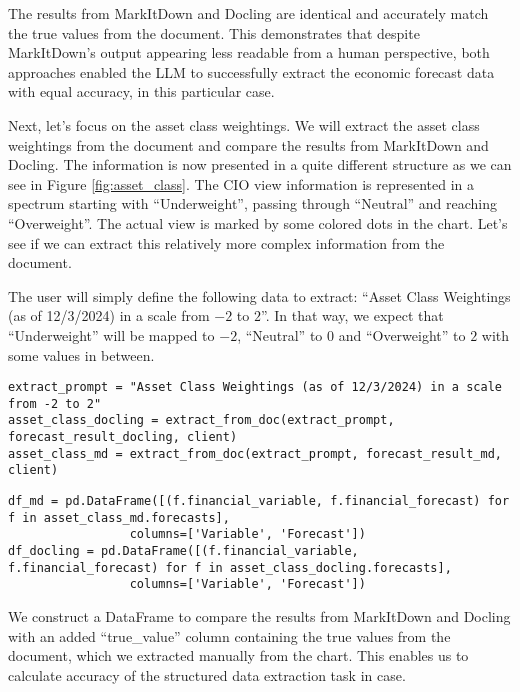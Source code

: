The results from MarkItDown and Docling are identical and accurately match the true values from the document. This demonstrates that despite MarkItDown's output appearing less readable from a human perspective, both approaches enabled the LLM to successfully extract the economic forecast data with equal accuracy, in this particular case.

Next, let's focus on the asset class weightings. We will extract the asset class weightings from the document and compare the results from MarkItDown and Docling. The information is now presented in a quite different structure as we can see in Figure \ref{fig:asset_class}. The CIO view information is represented in a spectrum starting with ``Underweight'', passing through ``Neutral'' and reaching ``Overweight''. The actual view is marked by some colored dots in the chart. Let's see if we can extract this relatively more complex information from the document.


The user will simply define the following data to extract: ``Asset Class Weightings (as of 12/3/2024) in a scale from $-2$ to $2$''. In that way, we expect that ``Underweight'' will be mapped to $-2$, ``Neutral'' to $0$ and ``Overweight'' to $2$ with some values in between.

\begin{verbatim}
extract_prompt = "Asset Class Weightings (as of 12/3/2024) in a scale from -2 to 2"
asset_class_docling = extract_from_doc(extract_prompt, forecast_result_docling, client)
asset_class_md = extract_from_doc(extract_prompt, forecast_result_md, client)
\end{verbatim}

\begin{verbatim}
df_md = pd.DataFrame([(f.financial_variable, f.financial_forecast) for f in asset_class_md.forecasts], 
                 columns=['Variable', 'Forecast'])
df_docling = pd.DataFrame([(f.financial_variable, f.financial_forecast) for f in asset_class_docling.forecasts], 
                 columns=['Variable', 'Forecast'])
\end{verbatim}

We construct a DataFrame to compare the results from MarkItDown and Docling with an added ``true\_value'' column containing the true values from the document, which we extracted manually from the chart. This enables us to calculate accuracy of the structured data extraction task in case.

